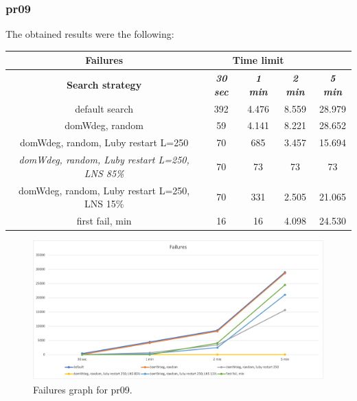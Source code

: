 \subsubsection{pr09}
The obtained results were the following:
{
\renewcommand{\arraystretch}{2}
\begin{longtable}[h]{| c | c | c | c | c |}
    \hline
    \textbf{Failures} & \multicolumn{3}{c}{Time limit} & \\
    \hline
    \textbf{Search strategy} & \textbf{\textit{30 sec}} & \textbf{\textit{1 min}} & \textbf{\textit{2 min}} & \textbf{\textit{5 min}} \\
    \hline
    \endhead
    default search                                         & 392 & 4.476 & 8.559 & 28.979 \\
    \hline
    domWdeg, random                                        &  59 & 4.141 & 8.221 & 28.652 \\
    \hline
    domWdeg, random, Luby restart L=250                    &  70 &  685 & 3.457 & 15.694 \\
    \hline
    \textit{domWdeg, random, Luby restart L=250, LNS 85\%} &  70 &   73 &   73 &    73 \\
    \hline
    domWdeg, random, Luby restart L=250, LNS 15\%          &  70 &  331 & 2.505 &  21.065 \\
    \hline
    first fail, min                                        &  16 &   16 & 4.098 &  24.530 \\
    \hline
\end{longtable}
}
\begin{figure}[H]
    \centering
    \includegraphics[width=1.0\columnwidth]{../graphs/pr09-failures.png}
    \caption{Failures graph for pr09.}
\end{figure}

